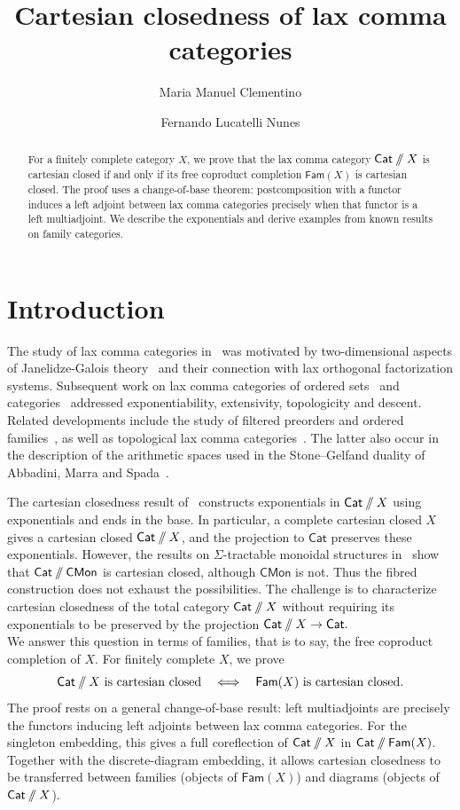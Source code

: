 \documentclass[11pt,a4paper]{amsart}
\title[Cartesian closedness of lax comma categories]{Cartesian closedness of lax comma categories}
\author{Maria Manuel Clementino}
\author{Fernando Lucatelli Nunes}
\date{}
\theoremstyle{definition}
\numberwithin{equation}{section}
\newcommand{\Cat}{\mathsf{Cat}}
\newcommand{\Fam}{\mathsf{Fam}}
\newcommand{\CMon}{\mathsf{CMon}}
\newcommand{\sslash}{\mathbin{/\mkern-6mu/}}
\newcommand{\DX}{\Cat\sslash X}
\begin{document}
\begin{abstract}
For a finitely complete category $X$, we prove that the lax comma category $\Cat\sslash X$ is cartesian closed if and only if its free coproduct completion $\Fam(X)$ is cartesian closed. The proof uses a change-of-base theorem: postcomposition with a functor induces a left adjoint between lax comma categories precisely when that functor is a left multiadjoint. We describe the exponentials and derive examples from known results on family categories.
\end{abstract}
\maketitle

\section*{Introduction}
The study of lax comma categories in~\cite{CN2} was motivated by
two-dimensional aspects of Janelidze-Galois theory~\cite{BJ} and
their connection with lax orthogonal factorization systems.
Subsequent work on lax comma categories of ordered sets~\cite{CNord}
and categories~\cite{CNP} addressed exponentiability, extensivity,
topologicity and descent. Related developments include the study of
filtered preorders and ordered families~\cite{CJ,CP}, as well as
topological lax comma categories~\cite{CHP}. The latter also occur
in the description of the arithmetic spaces used in the Stone--Gelfand
duality of Abbadini, Marra and Spada~\cite{AMS}.

The cartesian closedness result of~\cite[Theorem~2.4]{CNP} constructs exponentials in $\Cat\sslash X$ using exponentials and ends in the base. In particular, a complete cartesian closed $X$ gives a cartesian closed $\Cat\sslash X$, and the projection to $\Cat$ preserves these exponentials. However, the results on $\Sigma$-tractable monoidal structures in~\cite{NV} show that $\Cat\sslash\CMon$ is cartesian closed, although $\CMon$ is not. Thus the fibred construction does not exhaust the possibilities. The challenge is to characterize cartesian closedness of the total category $\Cat\sslash X$ without requiring its exponentials to be preserved by the projection
$ \Cat\sslash X\to \Cat .$\\
We answer this question in terms of families, that is to say, the free coproduct completion of $X$. For finitely complete $X$, we prove
\[
 \DX\text{ is cartesian closed}
 \quad\Longleftrightarrow\quad
 \Fam(X)\text{ is cartesian closed}.
\]
The proof rests on a general change-of-base result: left multiadjoints are precisely the functors inducing left adjoints between lax comma categories. For the singleton embedding, this gives a full coreflection of $\DX$ in $\Cat\sslash\Fam(X)$. Together with the discrete-diagram embedding, it allows cartesian closedness to be transferred between families (objects of $\Fam(X)$) and diagrams (objects of $\DX$).
\end{document}
